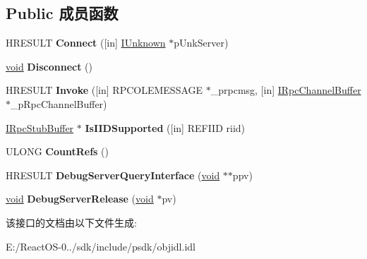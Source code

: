 \subsection*{Public 成员函数}
\begin{DoxyCompactItemize}
\item 
\mbox{\label{interface_i_rpc_stub_buffer_aeaf555879dea73419b05db957c6303fc}} 
H\+R\+E\+S\+U\+LT {\bfseries Connect} (\mbox{[}in\mbox{]} \hyperlink{interface_i_unknown}{I\+Unknown} $\ast$p\+Unk\+Server)
\item 
\mbox{\label{interface_i_rpc_stub_buffer_aa1090d4c5841e473dfc4296e93a95a59}} 
\hyperlink{interfacevoid}{void} {\bfseries Disconnect} ()
\item 
\mbox{\label{interface_i_rpc_stub_buffer_a009faacf879e304315d29dc4f7dbdfc8}} 
H\+R\+E\+S\+U\+LT {\bfseries Invoke} (\mbox{[}in\mbox{]} R\+P\+C\+O\+L\+E\+M\+E\+S\+S\+A\+GE $\ast$\+\_\+prpcmsg, \mbox{[}in\mbox{]} \hyperlink{interface_i_rpc_channel_buffer}{I\+Rpc\+Channel\+Buffer} $\ast$\+\_\+p\+Rpc\+Channel\+Buffer)
\item 
\mbox{\label{interface_i_rpc_stub_buffer_a48aae62014eefd0f969d2ba1f38a8ea7}} 
\hyperlink{interface_i_rpc_stub_buffer}{I\+Rpc\+Stub\+Buffer} $\ast$ {\bfseries Is\+I\+I\+D\+Supported} (\mbox{[}in\mbox{]} R\+E\+F\+I\+ID riid)
\item 
\mbox{\label{interface_i_rpc_stub_buffer_ac4d016726636452ebbf8bd53676faa5e}} 
U\+L\+O\+NG {\bfseries Count\+Refs} ()
\item 
\mbox{\label{interface_i_rpc_stub_buffer_afffab017b335fd94738cd3b4415b4cc8}} 
H\+R\+E\+S\+U\+LT {\bfseries Debug\+Server\+Query\+Interface} (\hyperlink{interfacevoid}{void} $\ast$$\ast$ppv)
\item 
\mbox{\label{interface_i_rpc_stub_buffer_abd732d72bdc5cbe13a523c2c48f4fae1}} 
\hyperlink{interfacevoid}{void} {\bfseries Debug\+Server\+Release} (\hyperlink{interfacevoid}{void} $\ast$pv)
\end{DoxyCompactItemize}


该接口的文档由以下文件生成\+:\begin{DoxyCompactItemize}
\item 
E\+:/\+React\+O\+S-\/0../sdk/include/psdk/objidl.\+idl\end{DoxyCompactItemize}

